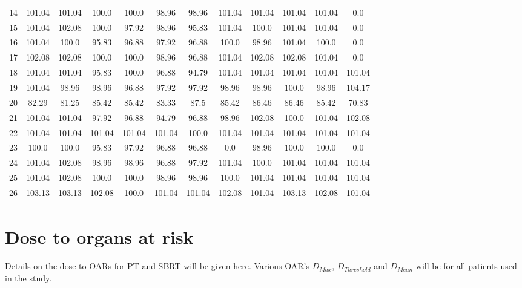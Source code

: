 \documentclass[type=dr, dr=rernat, accentcolor=tud7b,colorbacktitle, bigchapter, openright, twoside, 12pt ]{tudthesis}
\begin{document}
\begin{table}[H]
\begin{tabular}{|c|c|c|c|c|c|c|c|c|c|c|c|}
14 & 101.04 & 101.04 & 100.0 & 100.0 & 98.96 & 98.96 & 101.04 & 101.04 & 101.04 & 101.04 & 0.0\\
15 & 101.04 & 102.08 & 100.0 & 97.92 & 98.96 & 95.83 & 101.04 & 100.0 & 101.04 & 101.04 & 0.0\\
16 & 101.04 & 100.0 & 95.83 & 96.88 & 97.92 & 96.88 & 100.0 & 98.96 & 101.04 & 100.0 & 0.0\\
17 & 102.08 & 102.08 & 100.0 & 100.0 & 98.96 & 96.88 & 101.04 & 102.08 & 102.08 & 101.04 & 0.0\\
18 & 101.04 & 101.04 & 95.83 & 100.0 & 96.88 & 94.79 & 101.04 & 101.04 & 101.04 & 101.04 & 101.04\\
19 & 101.04 & 98.96 & 98.96 & 96.88 & 97.92 & 97.92 & 98.96 & 98.96 & 100.0 & 98.96 & 104.17\\
20 & 82.29 & 81.25 & 85.42 & 85.42 & 83.33 & 87.5 & 85.42 & 86.46 & 86.46 & 85.42 & 70.83\\
21 & 101.04 & 101.04 & 97.92 & 96.88 & 94.79 & 96.88 & 98.96 & 102.08 & 100.0 & 101.04 & 102.08\\
22 & 101.04 & 101.04 & 101.04 & 101.04 & 101.04 & 100.0 & 101.04 & 101.04 & 101.04 & 101.04 & 101.04\\
23 & 100.0 & 100.0 & 95.83 & 97.92 & 96.88 & 96.88 & 0.0 & 98.96 & 100.0 & 100.0 & 0.0\\
24 & 101.04 & 102.08 & 98.96 & 98.96 & 96.88 & 97.92 & 101.04 & 100.0 & 101.04 & 101.04 & 101.04\\
25 & 101.04 & 102.08 & 100.0 & 100.0 & 98.96 & 98.96 & 100.0 & 101.04 & 101.04 & 101.04 & 101.04\\
26 & 103.13 & 103.13 & 102.08 & 100.0 & 101.04 & 101.04 & 102.08 & 101.04 & 103.13 & 102.08 & 101.04\\
\hline\hline
  \end{tabular}
  \label{tab:oarlimits3}
\end{table}

\newpage
\section{Dose to organs at risk}

Details on the dose to OARs for PT and SBRT will be given here. Various OAR's $D_{Max}$, $D_{Threshold}$ and $D_{Mean}$ will be for all patients used in the study.
\end{document}
